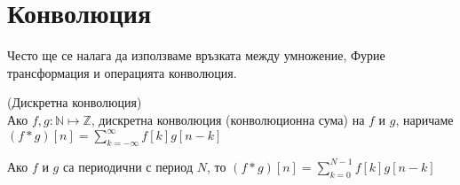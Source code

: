 \documentclass[main.tex]{subfiles}
\begin{document}
    \section{Конволюция}

    Често ще се налага да използваме връзката между умножение, Фурие трансформация и операцията конволюция.
    
    \begin{definition*}{(Дискретна конволюция)}\\
        \label{appendix:fourier:conv}
        Ако $f, g: \mathbb{N} \mapsto \mathbb{Z}$, дискретна конволюция (конволюционна сума) на $f$ и $g$, наричаме
        $(f\ast g)[n] = \sum\limits_{k=-\infty}^{\infty} f[k]g[n-k]$

        Ако $f$ и $g$ са периодични с период $N$, то
        $(f\ast g)[n] = \sum\limits_{k=0}^{N-1} f[k]g[n-k]$
    \end{definition*}
        
\end{document}
